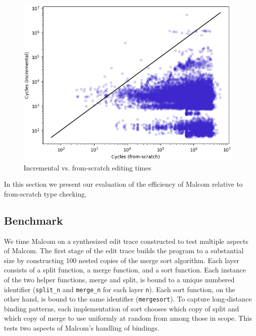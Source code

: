 \documentclass[acmsmall,dvipsnames,10pt,nonacm]{acmart}\settopmatter{printfolios=true} %
\providecommand{\DIFaddbeginFL}{} %
\providecommand{\DIFaddendFL}{} %
\providecommand{\DIFdelbeginFL}{} %
\providecommand{\DIFdelendFL}{} %
\newcommand{\DIFscaledelfig}{0.5}
\newlength{\DIFdelgraphicswidth} %
\newlength{\DIFdelgraphicsheight} %
\newcommand{\DIFaddincludegraphics}[2][]{{\color{blue}\fbox{\DIFOincludegraphics[#1]{#2}}}} %
\newcommand{\DIFdelincludegraphics}[2][]{%
\sbox{\DIFdelgraphicsbox}{\DIFOincludegraphics[#1]{#2}}%
\settoboxwidth{\DIFdelgraphicswidth}{\DIFdelgraphicsbox} %
\settoboxtotalheight{\DIFdelgraphicsheight}{\DIFdelgraphicsbox} %
\scalebox{\DIFscaledelfig}{%
\parbox[b]{\DIFdelgraphicswidth}{\usebox{\DIFdelgraphicsbox}\\[-\baselineskip] \rule{\DIFdelgraphicswidth}{0em}}\llap{\resizebox{\DIFdelgraphicswidth}{\DIFdelgraphicsheight}{%
\setlength{\unitlength}{\DIFdelgraphicswidth}%
\begin{picture}(1,1)%
\thicklines\linethickness{2pt} %
{\color[rgb]{1,0,0}\put(0,0){\framebox(1,1){}}}%
{\color[rgb]{1,0,0}\put(0,0){\line( 1,1){1}}}%
{\color[rgb]{1,0,0}\put(0,1){\line(1,-1){1}}}%
\end{picture}%
}\hspace*{3pt}}} %
} %
\DeclareRobustCommand{\DIFaddbeginFL}{\DIFOaddbeginFL \let\includegraphics\DIFaddincludegraphics} %
\DeclareRobustCommand{\DIFaddendFL}{\DIFOaddendFL \let\includegraphics\DIFOincludegraphics} %
\DeclareRobustCommand{\DIFdelbeginFL}{\DIFOdelbeginFL \let\includegraphics\DIFdelincludegraphics} %
\DeclareRobustCommand{\DIFdelendFL}{\DIFOaddendFL \let\includegraphics\DIFOincludegraphics} %
\begin{document}
\begin{figure}
\DIFdelbeginFL %
\DIFdelendFL \DIFaddbeginFL \includegraphics[width=0.75\linewidth]{images/scatter-plot.png}
\DIFaddendFL \caption{Incremental vs. from-scratch editing times}
\label{fig:scatter-plot}
\end{figure}


In this section we present our evaluation of the efficiency of Malcom relative to from-scratch type checking.  

\subsection{Benchmark}
We time Malcom on a synthesized edit trace constructed to test multiple aspects of Malcom. The first stage of the edit trace builds the program to a substantial size by constructing 100 nested copies of the merge sort algorithm. Each layer consists of a split function, a merge function, and a sort function. Each instance of the two helper functions, merge and split, is bound to a unique numbered identifier (\texttt{split\_n} and \texttt{merge\_n} for each layer \texttt{n}). Each sort function, on the other hand, is bound to the same identifier (\texttt{mergesort}). To capture long-distance binding patterns, each implementation of sort chooses which copy of split and which copy of merge to use uniformly at random from among those in scope. This  tests two aspects of Malcom's handling of bindings.
\end{document}
